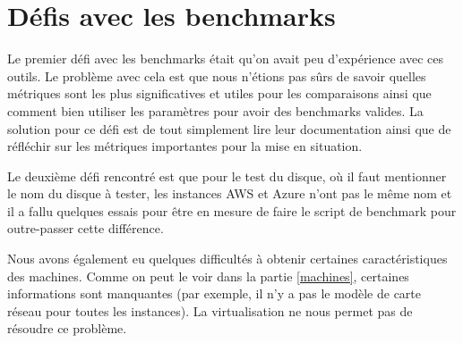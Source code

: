 \chapter{Défis avec les benchmarks}

Le premier défi avec les benchmarks était qu'on avait peu d'expérience avec ces outils. Le problème avec cela est que nous n'étions pas sûrs de savoir quelles métriques sont les plus significatives et utiles pour les comparaisons ainsi que comment bien utiliser les paramètres pour avoir des benchmarks valides. La solution pour ce défi est de tout simplement lire leur documentation ainsi que de réfléchir sur les métriques importantes pour la mise en situation. \newline

Le deuxième défi rencontré est que pour le test du disque, où il faut mentionner le nom du disque à tester, les instances AWS et Azure n'ont pas le même nom et il a fallu quelques essais pour être en mesure de faire le script de benchmark pour outre-passer cette différence. \newline

Nous avons également eu quelques difficultés à obtenir certaines caractéristiques des machines. Comme on peut le voir dans la partie \ref{machines}, certaines informations sont manquantes (par exemple, il n'y a pas le modèle de carte réseau pour toutes les instances). La virtualisation ne nous permet pas de résoudre ce problème. 
